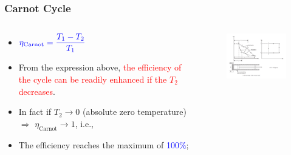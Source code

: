 \documentclass[10pt,compress]{beamer}
\begin{document}
\begin{frame}
 \frametitle{Carnot Cycle}
 \begin{columns}
  \begin{column}[c]{0.4\linewidth}
   \begin{itemize}
    \item <1-> $\textcolor{blue}{\eta_{\text{Carnot}}=\displaystyle\frac{T_{1}-T_{2}}{T_{1}}}$
    \item <1-> From the expression above, \textcolor{red}{the efficiency of the cycle can be readily enhanced if the $T_{2}$ decreases}. 
    \item <2-> In fact if $T_{2}\to 0$ (absolute zero temperature) $\Longrightarrow$ $\eta_{\text{Carnot}} \to 1$, i.e., 
    \item <3-> The efficiency reaches the maximum of \textcolor{blue}{100$\%$};
   \end{itemize}
  \end{column}
  \begin{column}[c]{0.6\linewidth}
   \begin{figure}%
    \begin{center}
     \includegraphics[width=7.5cm,clip]{./Pics/GasCycle_CarnotCycle}
    \end{center}
   \end{figure}  
  \end{column}  
 \end{columns}
\end{frame}
\end{document}
